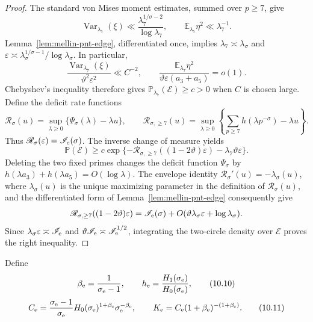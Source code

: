 \documentclass[11pt]{article}
\theoremstyle{definition}
\theoremstyle{remark}
\newcommand{\eps}{\varepsilon}
\begin{document}
\begin{proof}
The standard von Mises moment estimates, summed over $p\ge7$, give
\[
 \operatorname{Var}_{\lambda_7}(\xi)
 \ll\frac{\lambda_7^{1/\sigma-2}}{\log\lambda_7},
 \qquad
 \mathbb E_{\lambda_7}\eta^2\ll\lambda_7^{-1}.
\]
Lemma~\ref{lem:mellin-pnt-edge}, differentiated once, implies
$\lambda_7\asymp\lambda_\sigma$ and
$\eps\asymp\lambda_\sigma^{1/\sigma-1}/\log\lambda_\sigma$.
In particular,
\[
 \frac{\operatorname{Var}_{\lambda_7}(\xi)}
      {\vartheta^2\eps^2}\ll C^{-2},
 \qquad
 \frac{\mathbb E_{\lambda_7}\eta^2}
      {\vartheta\eps(a_3+a_5)}=o(1).
\]
Chebyshev's inequality therefore gives
$\mathbb P_{\lambda_7}(\mathcal E)\ge c>0$ when $C$ is chosen large.
Define the deficit rate functions
\[
 \mathscr R_\sigma(u)=
 \sup_{\lambda\ge0}\{\Psi_\sigma(\lambda)-\lambda u\},
 \qquad
 \mathscr R_{\sigma,\ge7}(u)=
 \sup_{\lambda\ge0}\left\{
  \sum_{p\ge7}h(\lambda p^{-\sigma})-\lambda u\right\}.
\]
Thus $\mathscr R_\sigma(\eps)=\mathscr I_{\rm e}(\sigma)$.  The inverse
change of measure yields
\[
 \mathbb P(\mathcal E)
 \ge c\exp\{-\mathscr R_{\sigma,\ge7}((1-2\vartheta)\eps)
                    -\lambda_7\vartheta\eps\}.
\]
Deleting the two fixed primes changes the deficit function $\Psi_\sigma$ by
$h(\lambda a_3)+h(\lambda a_5)=O(\log\lambda)$.  The envelope identity
$\mathscr R_\sigma'(u)=-\lambda_\sigma(u)$, where $\lambda_\sigma(u)$ is the
unique maximizing parameter in the definition of $\mathscr R_\sigma(u)$, and the
differentiated form of
Lemma~\ref{lem:mellin-pnt-edge} consequently give
\[
 \mathscr R_{\sigma,\ge7}((1-2\vartheta)\eps)
 =\mathscr I_{\rm e}(\sigma)
  +O(\vartheta\lambda_\sigma\eps+\log\lambda_\sigma).
\]
Since
$\lambda_\sigma\eps\asymp\mathscr I_{\rm e}$ and
$\vartheta\mathscr I_{\rm e}\asymp\mathscr I_{\rm e}^{1/2}$, integrating
the two-circle density over $\mathcal E$ proves the right inequality.
\end{proof}

Define
\[
 \beta_{\rm e}=\frac1{\sigma_{\rm e}-1},\qquad
 h_{\rm e}=\frac{H_1(\sigma_{\rm e})}{H_0(\sigma_{\rm e})},
\tag{10.10}
\]
\[
 C_{\rm e}=\frac{\sigma_{\rm e}-1}{\sigma_{\rm e}}
 H_0(\sigma_{\rm e})^{1+\beta_{\rm e}}
 \sigma_{\rm e}^{-\beta_{\rm e}},\qquad
 K_{\rm e}=C_{\rm e}(1+\beta_{\rm e})^{-(1+\beta_{\rm e})}.
\tag{10.11}
\]
\end{document}

